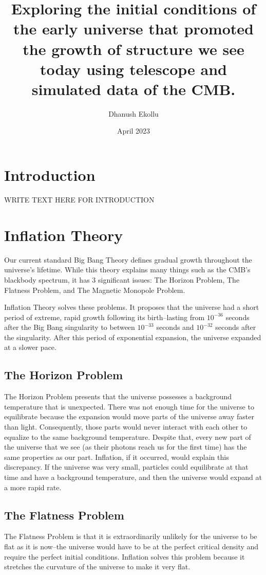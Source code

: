 \documentclass[12pt]{article}
\title{Exploring the initial conditions of the early universe that promoted the growth of structure we see today using telescope and simulated data of the CMB.}
\author{Dhanush Ekollu}
\date{April 2023}
\begin{document}
\maketitle

\section{Introduction}
WRITE TEXT HERE FOR INTRODUCTION

\section{Inflation Theory}
Our current standard Big Bang Theory defines gradual growth throughout the universe’s lifetime. While this theory explains many things such as the CMB’s blackbody spectrum, it has 3 significant issues: The Horizon Problem, The Flatness Problem, and The Magnetic Monopole Problem.

Inflation Theory solves these problems. It proposes that the universe had a short period of extreme, rapid growth following its birth–lasting from $10^{-36}$ seconds after the Big Bang singularity to between $10^{-33}$ seconds and $10^{-32}$ seconds after the singularity. After this period of exponential expansion, the universe expanded at a slower pace.

\subsection{The Horizon Problem}
The Horizon Problem presents that the universe possesses a background temperature that is unexpected. There was not enough time for the universe to equilibrate because the expansion would move parts of the universe away faster than light. Consequently, those parts would never interact with each other to equalize to the same background temperature. Despite that, every new part of the universe that we see (as their photons reach us for the first time) has the same properties as our part. Inflation, if it occurred, would explain this discrepancy. If the universe was very small, particles could equilibrate at that time and have a background temperature, and then the universe would expand at a more rapid rate.

\subsection{The Flatness Problem}
The Flatness Problem is that it is extraordinarily unlikely for the universe to be flat as it is now–the universe would have to be at the perfect critical density and require the perfect initial conditions. Inflation solves this problem because it stretches the curvature of the universe to make it very flat.
\end{document}
